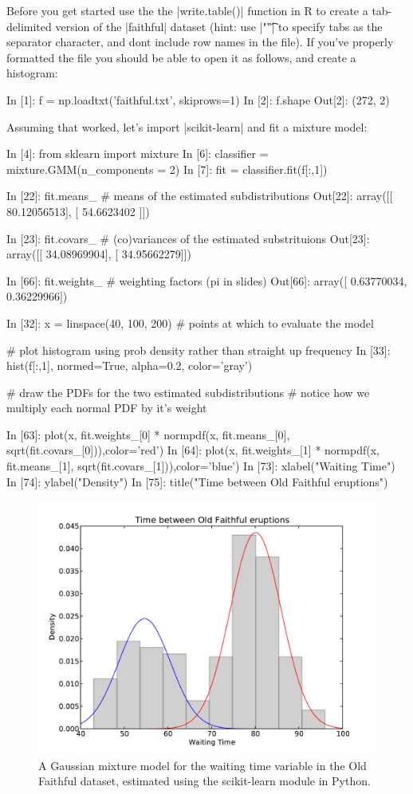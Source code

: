 Before you get started use the the |write.table()| function in R to create a tab-delimited version of the |faithful| dataset (hint: use |"\t"| to specify tabs as the separator character, and dont include row names in the file). If you've properly formatted the file you should be able to open it as follows, and create a histogram:
%
\begin{python}
In [1]: f = np.loadtxt('faithful.txt', skiprows=1)
In [2]: f.shape
Out[2]: (272, 2)
\end{python}
%
Assuming that worked, let's import |scikit-learn| and fit a mixture model:
%
\begin{python}
In [4]: from sklearn import mixture
In [6]: classifier = mixture.GMM(n_components = 2)
In [7]: fit = classifier.fit(f[:,1])

In [22]: fit.means_  # means of the estimated subdistributions
Out[22]:
array([[ 80.12056513],
       [ 54.6623402 ]])

In [23]: fit.covars_  # (co)variances of the estimated substrituions
Out[23]:
array([[ 34.08969904],
       [ 34.95662279]])

In [66]: fit.weights_   #  weighting factors (pi in slides)
Out[66]: array([ 0.63770034,  0.36229966])

In [32]: x = linspace(40, 100, 200) # points at which to evaluate the model

# plot histogram using prob density rather than straight up frequency
In [33]: hist(f[:,1], normed=True, alpha=0.2, color='gray')

# draw the PDFs for the two estimated subdistributions
# notice how we multiply each normal PDF by it's weight

In [63]: plot(x, fit.weights_[0] * normpdf(x, fit.means_[0], sqrt(fit.covars_[0])),color='red')
In [64]: plot(x, fit.weights_[1] * normpdf(x, fit.means_[1], sqrt(fit.covars_[1])),color='blue')
In [73]: xlabel("Waiting Time")
In [74]: ylabel("Density")
In [75]: title("Time between Old Faithful eruptions")
\end{python}

\begin{figure}[!ht]
    \centering
    \includegraphics[width=0.5\columnwidth]{./figures/hands-on10/faithful-python.pdf}
    \caption{A Gaussian mixture model for the waiting time variable in the Old Faithful dataset, estimated using the scikit-learn module in Python.}\label{fig:faithfulpy}
\end{figure}

